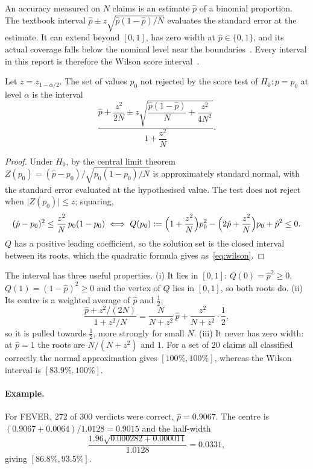 An accuracy measured on $N$ claims is an estimate $\hat{p}$ of a binomial proportion. The textbook interval $\hat{p} \pm z \sqrt{\hat{p}(1-\hat{p})/N}$ evaluates the standard error at the estimate. It can extend beyond $[0,1]$, has zero width at $\hat{p} \in \{0, 1\}$, and its actual coverage falls below the nominal level near the boundaries~\citep{brown2001interval}. Every interval in this report is therefore the Wilson score interval~\citep{wilson1927probable}.

\begin{proposition}
Let $z = z_{1-\alpha/2}$. The set of values $p_0$ not rejected by the score test of $H_0 : p = p_0$ at level $\alpha$ is the interval
\begin{equation}
\label{eq:wilson}
  \frac{\hat{p} + \dfrac{z^2}{2N} \pm z \sqrt{\dfrac{\hat{p}(1-\hat{p})}{N} + \dfrac{z^2}{4N^2}}}{1 + \dfrac{z^2}{N}} .
\end{equation}
\end{proposition}

\begin{proof}
Under $H_0$, by the central limit theorem $Z(p_0) = (\hat{p} - p_0) / \sqrt{p_0(1-p_0)/N}$ is approximately standard normal, with the standard error evaluated at the hypothesised value. The test does not reject when $\lvert Z(p_0) \rvert \le z$; squaring,
\[
  (\hat{p} - p_0)^2 \le \frac{z^2}{N}\, p_0 (1-p_0)
  \iff
  Q(p_0) := \Bigl(1 + \frac{z^2}{N}\Bigr) p_0^2 - \Bigl(2\hat{p} + \frac{z^2}{N}\Bigr) p_0 + \hat{p}^2 \le 0 .
\]
$Q$ has a positive leading coefficient, so the solution set is the closed interval between its roots, which the quadratic formula gives as~\eqref{eq:wilson}.
\end{proof}

The interval has three useful properties. (i) It lies in $[0,1]$: $Q(0) = \hat{p}^2 \ge 0$, $Q(1) = (1-\hat{p})^2 \ge 0$ and the vertex of $Q$ lies in $[0,1]$, so both roots do. (ii) Its centre is a weighted average of $\hat{p}$ and $\tfrac12$,
\[
  \frac{\hat{p} + z^2/(2N)}{1 + z^2/N} = \frac{N}{N + z^2}\,\hat{p} + \frac{z^2}{N + z^2} \cdot \frac{1}{2},
\]
so it is pulled towards $\tfrac12$, more strongly for small $N$. (iii) It never has zero width: at $\hat{p} = 1$ the roots are $N/(N + z^2)$ and $1$. For a set of 20 claims all classified correctly the normal approximation gives $[100\%, 100\%]$, whereas the Wilson interval is $[83.9\%, 100\%]$.

\paragraph{Example.} For FEVER, 272 of 300 verdicts were correct, $\hat{p} = 0.9067$. The centre is $(0.9067 + 0.0064)/1.0128 = 0.9015$ and the half-width
\[
  \frac{1.96 \sqrt{0.000282 + 0.000011}}{1.0128} = 0.0331,
\]
giving $[86.8\%, 93.5\%]$.

